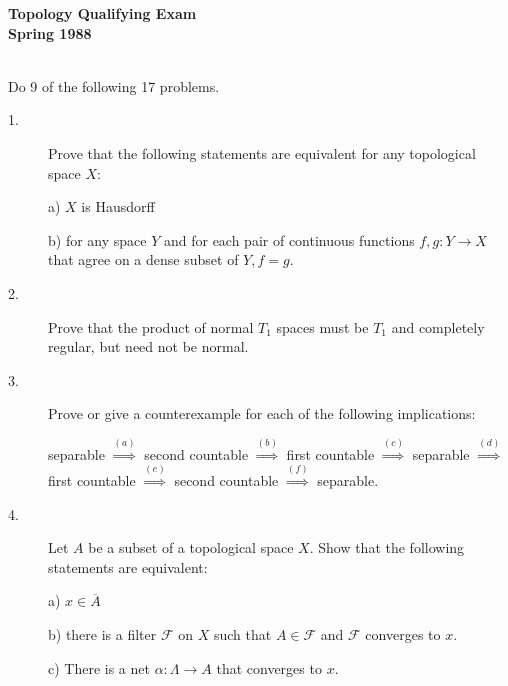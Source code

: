 \documentclass{article}
\begin{document}






\begin{center}\begin{LARGE}
{\bf Topology Qualifying Exam}\\ 
{\bf Spring 1988}\\ \end{LARGE}
\end{center}
\vspace{0.1in}
\noindent\hrulefill\\

Do 9 of the following 17 problems.

\begin{description}
\item[1.]
Prove that the following statements are equivalent for any topological space
$X$:

\item[\quad] a)
$X$ is Hausdorff

\item[\quad] b)
for any space $Y$ and for each pair of continuous functions
$f, g: Y \to X$ that agree on a dense subset of $Y, f=g$.

\item[2.]
Prove that the product of normal $T_1$ spaces must be $T_1$ and completely
regular, but need not be normal.

\item[3.]
Prove or give a counterexample for each of the following  implications:

separable $\stackrel{(a)}{\Longrightarrow}$ second countable
$\stackrel{(b)}{\Longrightarrow}$ first countable $\stackrel{(c)}{\Longrightarrow}$
separable $\stackrel{(d)}{\Longrightarrow}$ first countable
$\stackrel{(e)}{\Longrightarrow}$ second countable $\stackrel{(f)}{\Longrightarrow}$
separable.

\item[4.]
Let $A$ be a subset of a topological space $X$. Show that the following
statements are equivalent:

\item[\quad] a)
$x \in \overline A$

\item[\quad] b)
there is a filter $\mathcal F$ on $X$ such that $A \in \mathcal F$ and
$\mathcal F$ converges to $x$.

\item[\quad] c)
There is a net $\alpha : \Lambda \to A$ that converges to $x$.


\end{description}
\end{document}
